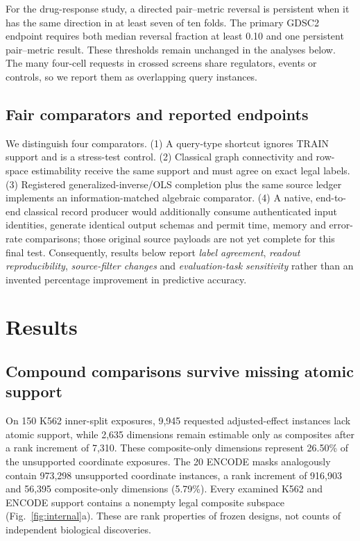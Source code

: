 \documentclass[preprint,11pt,times,number,sort&compress]{elsarticle}
\begin{document}
For the drug-response study, a directed pair--metric reversal is persistent when it has the same direction in at least seven of ten folds. The primary GDSC2 endpoint requires both median reversal fraction at least 0.10 and one persistent pair--metric result. These thresholds remain unchanged in the analyses below. The many four-cell requests in crossed screens share regulators, events or controls, so we report them as overlapping query instances.

\subsection{Fair comparators and reported endpoints}
We distinguish four comparators. (1) A query-type shortcut ignores TRAIN support and is a stress-test control. (2) Classical graph connectivity and row-space estimability receive the same support and must agree on exact legal labels. (3) Registered generalized-inverse/OLS completion plus the same source ledger implements an information-matched algebraic comparator. (4) A native, end-to-end classical record producer would additionally consume authenticated input identities, generate identical output schemas and permit time, memory and error-rate comparisons; those original source payloads are not yet complete for this final test. Consequently, results below report \emph{label agreement}, \emph{readout reproducibility}, \emph{source-filter changes} and \emph{evaluation-task sensitivity} rather than an invented percentage improvement in predictive accuracy.

\section{Results}\label{sec:results}
\subsection{Compound comparisons survive missing atomic support}
On 150 K562 inner-split exposures, 9,945 requested adjusted-effect instances lack atomic support, while 2,635 dimensions remain estimable only as composites after a rank increment of 7,310. These composite-only dimensions represent 26.50\% of the unsupported coordinate exposures. The 20 ENCODE masks analogously contain 973,298 unsupported coordinate instances, a rank increment of 916,903 and 56,395 composite-only dimensions (5.79\%). Every examined K562 and ENCODE support contains a nonempty legal composite subspace (Fig.~\ref{fig:internal}a). These are rank properties of frozen designs, not counts of independent biological discoveries.
\end{document}
